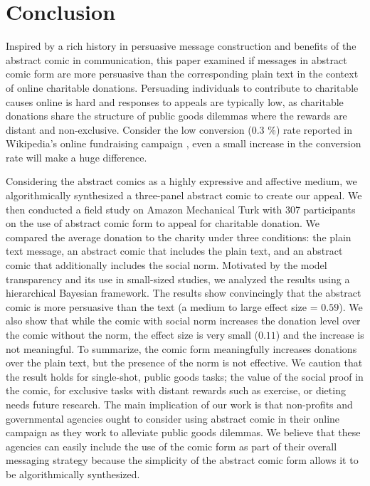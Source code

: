 \section{Conclusion}
\label{sec:Conclusion}

Inspired by a rich history in persuasive message construction and benefits of the abstract comic in communication, this paper examined if messages in abstract comic form are more persuasive than the corresponding plain text in the context of online charitable donations. Persuading individuals to contribute to charitable causes online is hard and responses to appeals are typically low, as charitable donations share the structure of public goods dilemmas where the rewards are distant and non-exclusive. Consider the low conversion (0.3 \%) rate reported in Wikipedia's online fundraising campaign \cite{wikimeta}, even a small increase in the conversion rate will make a huge difference. 

Considering the abstract comics as a highly expressive and affective medium, we algorithmically synthesized a three-panel abstract comic to create our appeal. We then conducted a field study on Amazon Mechanical Turk with 307 participants on the use of abstract comic form to appeal for charitable donation. We compared the average donation to the charity under three conditions: the plain text message, an abstract comic that includes the plain text, and an abstract comic that additionally includes the social norm. Motivated by the model transparency and its use in small-sized studies, we analyzed the results using a hierarchical Bayesian framework. The results show convincingly that the abstract comic is more persuasive than the text (a medium to large effect size = $0.59$). We also show that while the comic with social norm increases the donation level over the comic without the norm, the effect size is very small ($0.11$) and the increase is not meaningful. To summarize, the comic form meaningfully increases donations over the plain text, but the presence of the norm is not effective. We caution that the result holds for single-shot, public goods tasks; the value of the social proof in the comic, for exclusive tasks with distant rewards such as exercise, or dieting needs future research. The main implication of our work is that non-profits and governmental agencies ought to consider using abstract comic in their online campaign as they work to alleviate public goods dilemmas. We believe that these agencies can easily include the use of the comic form as part of their overall messaging strategy because the simplicity of the abstract comic form allows it to be algorithmically synthesized. 


